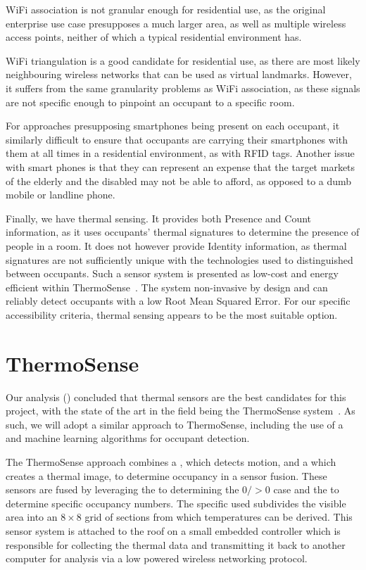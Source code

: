 \documentclass[../thesis/thesis.tex]{subfiles}
\begin{document}
WiFi association is not granular enough for residential use, as the original enterprise use case presupposes a much larger area, as well as multiple wireless access points, neither of which a typical residential environment has.

WiFi triangulation is a good candidate for residential use, as there are most likely neighbouring wireless networks that can be used as virtual landmarks. However, it suffers from the same granularity problems as WiFi association, as these signals are not specific enough to pinpoint an occupant to a specific room.

For approaches presupposing smartphones being present on each occupant, it similarly difficult to ensure that occupants are carrying their smartphones with them at all times in a residential environment, as with RFID tags.  Another issue with smart phones is that they can represent an expense that the target markets of the elderly and the disabled may not be able to afford, as opposed to a dumb mobile or landline phone.

Finally, we have thermal sensing. It provides both Presence and Count information, as it uses occupants' thermal signatures to determine the presence of people in a room. It does not however provide Identity information, as thermal signatures are not sufficiently unique with the technologies used to distinguished between occupants. Such a sensor system is presented as low-cost and energy efficient within ThermoSense~\cite{beltran2013thermosense}. The system non-invasive by design and can reliably detect occupants with a low Root Mean Squared Error. For our specific accessibility criteria, thermal sensing appears to be the most suitable option.

\section{ThermoSense}
\label{sec:litreview:thermalsensors}
Our analysis () concluded that thermal sensors are the best candidates for this project, with the state of the art in the field being the ThermoSense system~\cite{beltran2013thermosense}. As such, we will adopt a similar approach to ThermoSense, including the use of a \iar and machine learning algorithms for occupant detection.

The ThermoSense approach combines a \pir, which detects motion, and a \iar which creates a thermal image, to determine occupancy in a sensor fusion. These sensors are fused by leveraging the \pir to determining the $0/>0$ case and the \iar to determine specific occupancy numbers. The specific \iar used subdivides the visible area into an $8\times8$ grid of sections from which temperatures can be derived. This sensor system is attached to the roof on a small embedded controller which is responsible for collecting the thermal data and transmitting it back to another computer for analysis via a low powered wireless networking protocol. 
\end{document}
